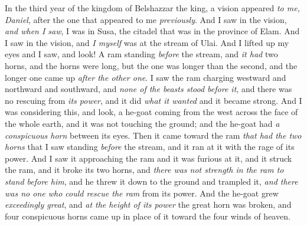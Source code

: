 \begin{biblechapter} %
 In the third year of the kingdom of Belshazzar the king, a vision appeared \textit{to me, Daniel}, after the one that appeared to me \textit{previously}.
\verse And I saw in the vision, \textit{and when I saw}, I was in Susa, the citadel that was in the province of Elam. And I saw in the vision, and \textit{I myself} was at the stream of Ulai.
\verse And I lifted up my eyes and I saw, and look! A ram standing \textit{before} the stream, and \textit{it had} two horns, and the horns were long, but the one was longer than the second, and the longer one came up \textit{after the other one}.
\verse I saw the ram charging westward and northward and southward, and \textit{none of the beasts stood before it}, and there was no rescuing from \textit{its power}, and it did \textit{what it wanted} and it became strong.
\verse And I was considering this, and look, a he-goat coming from the west across the face of the whole earth, and it was not touching the ground; and the he-goat had \textit{a conspicuous horn} between its eyes.
\verse Then it came toward the ram \textit{that had the two horns} that I saw standing \textit{before} the stream, and it ran at it with the rage of its power.
\verse And I saw it approaching the ram and it was furious at it, and it struck the ram, and it broke its two horns, and \textit{there was not strength in the ram to stand before him}, and he threw it down to the ground and trampled it, \textit{and there was no one who could rescue the ram} from its power.
\verse And the he-goat grew \textit{exceedingly great}, and \textit{at the height of its power} the great horn was broken, and four conspicuous horns came up in place of it toward the four winds of heaven.

\end{biblechapter}

